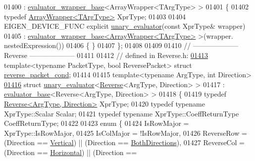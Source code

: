 \begin{DoxyCode}
01400   : \hyperlink{struct_eigen_1_1internal_1_1evaluator__wrapper__base}{evaluator\_wrapper\_base}<ArrayWrapper<TArgType> >
01401 \{
01402   \textcolor{keyword}{typedef} \hyperlink{group___core___module_class_eigen_1_1_array_wrapper}{ArrayWrapper<TArgType>} XprType;
01403 
01404   EIGEN\_DEVICE\_FUNC \textcolor{keyword}{explicit} \hyperlink{struct_eigen_1_1internal_1_1unary__evaluator}{unary\_evaluator}(\textcolor{keyword}{const} XprType& wrapper)
01405     : \hyperlink{struct_eigen_1_1internal_1_1evaluator__wrapper__base}{evaluator\_wrapper\_base<ArrayWrapper<TArgType>} >(wrapper.
      nestedExpression())
01406   \{ \}
01407 \};
01408 
01409 
01410 \textcolor{comment}{// -------------------- Reverse --------------------}
01411 
01412 \textcolor{comment}{// defined in Reverse.h:}
\hyperlink{struct_eigen_1_1internal_1_1reverse__packet__cond}{01413} \textcolor{keyword}{template}<\textcolor{keyword}{typename} PacketType, \textcolor{keywordtype}{bool} ReversePacket> \textcolor{keyword}{struct }\hyperlink{struct_eigen_1_1internal_1_1reverse__packet__cond}{reverse\_packet\_cond};
01414 
01415 \textcolor{keyword}{template}<\textcolor{keyword}{typename} ArgType, \textcolor{keywordtype}{int} Direction>
\hyperlink{struct_eigen_1_1internal_1_1unary__evaluator_3_01_reverse_3_01_arg_type_00_01_direction_01_4_01_4}{01416} \textcolor{keyword}{struct }\hyperlink{struct_eigen_1_1internal_1_1unary__evaluator}{unary\_evaluator}<\hyperlink{group___core___module_class_eigen_1_1_reverse}{Reverse}<ArgType, Direction> >
01417   : \hyperlink{struct_eigen_1_1internal_1_1evaluator__base}{evaluator\_base}<Reverse<ArgType, Direction> >
01418 \{
01419   \textcolor{keyword}{typedef} \hyperlink{group___core___module_class_eigen_1_1_reverse}{Reverse<ArgType, Direction>} XprType;
01420   \textcolor{keyword}{typedef} \textcolor{keyword}{typename} XprType::Scalar Scalar;
01421   \textcolor{keyword}{typedef} \textcolor{keyword}{typename} XprType::CoeffReturnType CoeffReturnType;
01422 
01423   \textcolor{keyword}{enum} \{
01424     IsRowMajor = XprType::IsRowMajor,
01425     IsColMajor = !IsRowMajor,
01426     ReverseRow = (Direction == \hyperlink{group__enums_ggad49a7b3738e273eb00932271b36127f7addca718e0564723df21d61b94b1198be}{Vertical})   || (Direction == 
      \hyperlink{group__enums_ggad49a7b3738e273eb00932271b36127f7aa01e40fce022901560ce6d9fdee2fde3}{BothDirections}),
01427     ReverseCol = (Direction == \hyperlink{group__enums_ggad49a7b3738e273eb00932271b36127f7aae8a16b3b9272683c1162915f6d892be}{Horizontal}) || (Direction == 

\end{DoxyCode}
